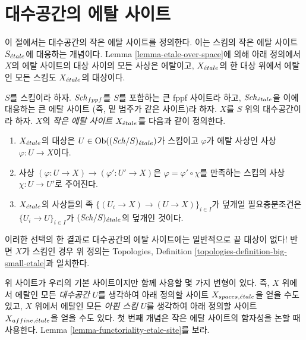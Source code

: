 \section{대수공간의 에탈 사이트}
\label{section-etale-site}

\noindent
이 절에서는 대수공간의 작은 에탈 사이트를 정의한다.
이는 스킴의 작은 에탈 사이트 $S_{\acute{e}tale}$에 대응하는 개념이다.
Lemma \ref{lemma-etale-over-space}에 의해 아래 정의에서
$X$의 에탈 사이트의 대상 사이의 모든 사상은 에탈이고,
$X_{\acute{e}tale}$의 한 대상 위에서 에탈인 모든 스킴도
$X_{\acute{e}tale}$의 대상이다.

\begin{definition}
\label{definition-etale-site}
$S$를 스킴이라 하자.
$\mathit{Sch}_{fppf}$를 $S$를 포함하는 큰 fppf 사이트라 하고,
$\mathit{Sch}_{\acute{e}tale}$을 이에 대응하는 큰 에탈 사이트
(즉, 밑 범주가 같은 사이트)라 하자.
$X$를 $S$ 위의 대수공간이라 하자.
$X$의 {\it 작은 에탈 사이트 $X_{\acute{e}tale}$}를 다음과 같이 정의한다.
\begin{enumerate}
\item $X_{\acute{e}tale}$의 대상은 $U \in \mathop{\mathrm{Ob}}\nolimits((\mathit{Sch}/S)_{\acute{e}tale})$가 스킴이고
$\varphi$가 에탈 사상인 사상 $\varphi : U \to X$이다.
\item 사상 $(\varphi : U \to X) \to (\varphi' : U' \to X)$은
$\varphi = \varphi' \circ \chi$를 만족하는 스킴의 사상
$\chi : U \to U'$로 주어진다.
\item $X_{\acute{e}tale}$의 사상들의 족
$\{(U_i \to X) \to (U \to X)\}_{i \in I}$가 덮개일 필요충분조건은
$\{U_i \to U\}_{i \in I}$가 $(\mathit{Sch}/S)_{\acute{e}tale}$의 덮개인 것이다.
\end{enumerate}
\end{definition}

\noindent
이러한 선택의 한 결과로 대수공간의 에탈 사이트에는 일반적으로
끝 대상이 없다! 반면 $X$가 스킴인 경우 위 정의는
Topologies, Definition \ref{topologies-definition-big-small-etale}과
일치한다.

\medskip\noindent
위 사이트가 우리의 기본 사이트이지만 함께 사용할 몇 가지 변형이 있다.
즉, $X$ 위에서 에탈인 모든 {\it 대수공간} $U$를 생각하여 아래 정의할
사이트 $X_{spaces, {\acute{e}tale}}$을 얻을 수도 있고, $X$ 위에서 에탈인
모든 {\it 아핀 스킴} $U$를 생각하여 아래 정의할 사이트
$X_{affine, {\acute{e}tale}}$을 얻을 수도 있다. 첫 번째 개념은 작은 에탈
사이트의 함자성을 논할 때 사용한다. Lemma
\ref{lemma-functoriality-etale-site}를 보라.

